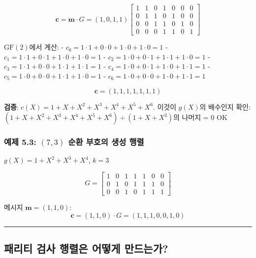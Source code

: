 \documentclass[
  oneside]{article}
\begin{document}
\[\mathbf{c} = \mathbf{m} \cdot G = (1, 0, 1, 1) \begin{bmatrix}
1 & 1 & 0 & 1 & 0 & 0 & 0 \\
0 & 1 & 1 & 0 & 1 & 0 & 0 \\
0 & 0 & 1 & 1 & 0 & 1 & 0 \\
0 & 0 & 0 & 1 & 1 & 0 & 1
\end{bmatrix}\]

\(\text{GF}(2)\)에서 계산: -
\(c_0 = 1 \cdot 1 + 0 \cdot 0 + 1 \cdot 0 + 1 \cdot 0 = 1\) -
\(c_1 = 1 \cdot 1 + 0 \cdot 1 + 1 \cdot 0 + 1 \cdot 0 = 1\) -
\(c_2 = 1 \cdot 0 + 0 \cdot 1 + 1 \cdot 1 + 1 \cdot 0 = 1\) -
\(c_3 = 1 \cdot 1 + 0 \cdot 0 + 1 \cdot 1 + 1 \cdot 1 = 1\) -
\(c_4 = 1 \cdot 0 + 0 \cdot 1 + 1 \cdot 0 + 1 \cdot 1 = 1\) -
\(c_5 = 1 \cdot 0 + 0 \cdot 0 + 1 \cdot 1 + 1 \cdot 0 = 1\) -
\(c_6 = 1 \cdot 0 + 0 \cdot 0 + 1 \cdot 0 + 1 \cdot 1 = 1\)

\[\mathbf{c} = (1, 1, 1, 1, 1, 1, 1)\]

\textbf{검증}: \(c(X) = 1 + X + X^2 + X^3 + X^4 + X^5 + X^6\). 이것이
\(g(X)\)의 배수인지 확인:
\((1 + X + X^2 + X^3 + X^4 + X^5 + X^6) \div (1 + X + X^3)\)의 나머지 =
\(0\) OK

\subsubsection{\texorpdfstring{예제 5.3: \((7, 3)\) 순환 부호의 생성
행렬}{예제 5.3: (7, 3) 순환 부호의 생성 행렬}}\label{uxc608uxc81c-5.3-7-3-uxc21cuxd658-uxbd80uxd638uxc758-uxc0dduxc131-uxd589uxb82c}

\(g(X) = 1 + X^2 + X^3 + X^4\), \(k = 3\)

\[G = \begin{bmatrix}
1 & 0 & 1 & 1 & 1 & 0 & 0 \\
0 & 1 & 0 & 1 & 1 & 1 & 0 \\
0 & 0 & 1 & 0 & 1 & 1 & 1
\end{bmatrix}\]

메시지 \(\mathbf{m} = (1, 1, 0)\):
\[\mathbf{c} = (1, 1, 0) \cdot G = (1, 1, 1, 0, 0, 1, 0)\]

\begin{center}\rule{0.5\linewidth}{0.5pt}\end{center}

\subsection{패리티 검사 행렬은 어떻게
만드는가?}\label{uxd328uxb9acuxd2f0-uxac80uxc0ac-uxd589uxb82cuxc740-uxc5b4uxb5bbuxac8c-uxb9ccuxb4dcuxb294uxac00}
\end{document}
